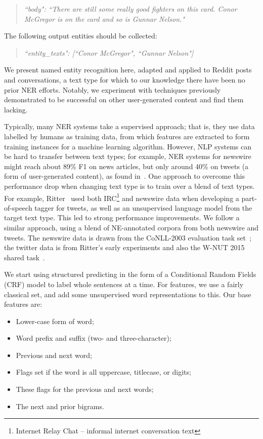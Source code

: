 \documentclass[10pt,journal,compsoc]{IEEEtran}
\begin{document}
\begin{quote}
\emph{``body": ``There are still some really good fighters on this card. Conor McGregor is on the card and so is Gunnar Nelson."}
\end{quote}

The following output entities should be collected:

\begin{quote}
\emph{``entity\_texts": [``Conor McGregor", ``Gunnar Nelson"]}
\end{quote}

We present named entity recognition here, adapted and applied to Reddit posts and conversations, a text type for which to our knowledge there have been no prior NER efforts.
Notably, we experiment with techniques previously demonstrated to be successful on other user-generated content and find them lacking.

Typically, many NER systems take a supervised approach; that is, they use data labelled by humans as training data, from which features are extracted to form training instances for a machine learning algorithm.
However, NLP systems can be hard to transfer between text types; for example, NER systems for newswire might reach about 89\% F1 on news articles, but only around 40\% on tweets (a form of user-generated content), as found in~\cite{derczynski2015analysis}.
One approach to overcome this performance drop when changing text type is to train over a blend of text types.
For example, Ritter~\cite{ritter2011named} used both IRC\footnote{Internet Relay Chat -- informal internet conversation text} and newswire data when developing a part-of-speech tagger for tweets, as well as an unsupervised language model from the target text type.
This led to strong performance improvements.
We follow a similar approach, using a blend of NE-annotated corpora from both newswire and tweets.
The newswire data is drawn from the CoNLL-2003 evaluation task set~\cite{tjong2003introduction}; the twitter data is from Ritter's early experiments and also the W-NUT 2015 shared task~\cite{ritter2011named,baldwin2015shared}.

We start using structured predicting in the form of a Conditional Random Fields (CRF) model to label whole sentences at a time.
For features, we use a fairly classical set, and add some unsupervised word representations to this.
Our base features are:

\begin{itemize}
\item Lower-case form of word;
\item Word prefix and suffix (two- and three-character);
\item Previous and next word;
\item Flags set if the word is all uppercase, titlecase, or digits;
\item These flags for the previous and next words;
\item The next and prior bigrams.
\end{itemize}
\end{document}
